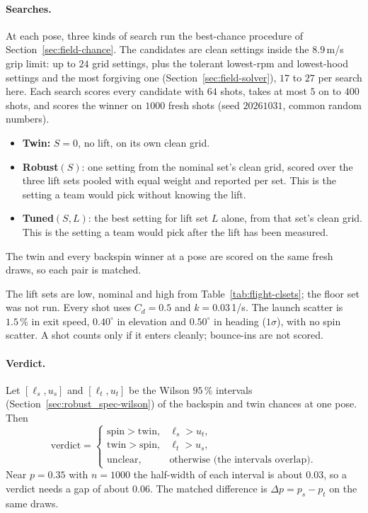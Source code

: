 \paragraph{Searches.} At each pose, three kinds of search run the best-chance procedure of
Section~\ref{sec:field-chance}. The candidates are clean settings inside the $8.9$\,\unit{m/s}\predicted{}
grip limit: up to $24$ grid settings, plus the tolerant lowest-rpm and lowest-hood settings and the most
forgiving one (Section~\ref{sec:field-solver}), $17$\derived{} to $27$\derived{} per search here. Each search
scores every candidate with $64$ shots, takes at most $5$ on to $400$ shots, and scores the winner on $1000$
fresh shots (seed $20261031$, common random numbers).
\begin{itemize}
  \item \textbf{Twin:} $S=0$, no lift, on its own clean grid.
  \item \textbf{Robust}$(S)$: one setting from the nominal set's clean grid, scored over the three lift sets
    pooled with equal weight\assumed{} and reported per set. This is the setting a team would pick without
    knowing the lift.
  \item \textbf{Tuned}$(S,L)$: the best setting for lift set $L$ alone, from that set's clean grid. This is
    the setting a team would pick after the lift has been measured.
\end{itemize}
The twin and every backspin winner at a pose are scored on the same fresh draws, so each pair is matched.

The lift sets are low, nominal and high from Table~\ref{tab:flight-clsets}; the floor set was not run. Every shot uses
$C_d=0.5$\assumed{} and $k=0.03$\,\unit{1/s}\assumed. The launch scatter is $1.5\,\%$\assumed{} in exit speed,
$0.40^\circ$\assumed{} in elevation and $0.50^\circ$\assumed{} in heading ($1\sigma$), with no spin scatter.
A shot counts only if it enters cleanly; bounce-ins are not scored.

\paragraph{Verdict.} Let $[\ell_s,u_s]$ and $[\ell_t,u_t]$ be the Wilson $95\,\%$ intervals
(Section~\ref{sec:robust_spec-wilson}) of the backspin and twin chances at one pose. Then
\begin{equation}
  \text{verdict}=\begin{cases}
    \text{spin} > \text{twin}, & \ell_s>u_t,\\
    \text{twin} > \text{spin}, & \ell_t>u_s,\\
    \text{unclear}, & \text{otherwise (the intervals overlap)}.
  \end{cases}
  \label{eq:svt-verdict}
\end{equation}
Near $p=0.35$\predicted{} with $n=1000$ the half-width of each interval is about $0.03$\derived, so a verdict
needs a gap of about $0.06$\derived. The matched difference is $\Delta p=p_s-p_t$ on the same draws.

